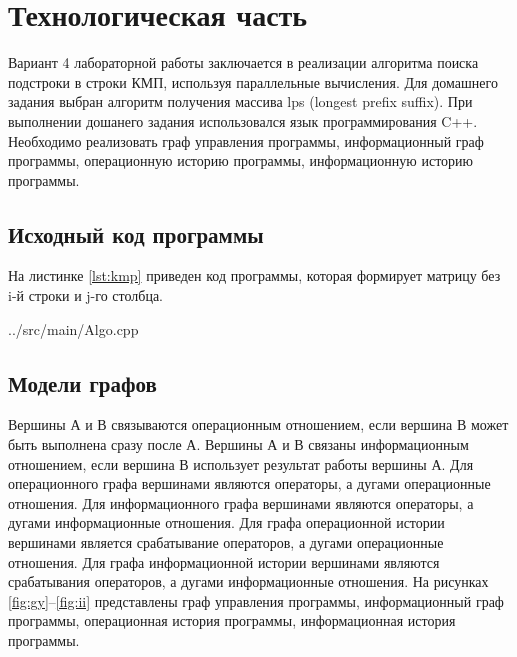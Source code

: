 \chapter{Технологическая часть}
Вариант 4 лабораторной работы заключается в реализации алгоритма поиска подстроки в строки КМП, используя параллельные вычисления. Для домашнего задания выбран алгоритм получения массива lps (longest prefix suffix). При выполнении дошанего задания использовался язык программирования C++. Необходимо реализовать граф управления программы, информационный граф программы, операционную историю программы, информационную историю программы. 
\section{Исходный код программы}
На листинке \ref{lst:kmp} приведен код программы, которая формирует матрицу без i-й строки и j-го столбца. 
\begin{lstinputlisting}[
	caption={Заполнение массива lps},
	label={lst:kmp},
	linerange={4-29}
	]{../src/main/Algo.cpp}
\end{lstinputlisting}
\section{Модели графов}
Вершины А и В связываются операционным отношением, если вершина В может быть выполнена сразу после А. Вершины А и В связаны информационным отношением, если вершина В использует результат работы вершины А. Для операционного графа вершинами являются операторы, а дугами операционные отношения. Для информационного графа вершинами являются операторы, а дугами информационные отношения. Для графа операционной истории вершинами является срабатывание операторов, а дугами операционные отношения. Для графа информационной истории вершинами являются срабатывания операторов, а дугами информационные отношения.
На рисунках \ref{fig:gy}--\ref{fig:ii} представлены граф управления программы, информационный граф программы, операционная история программы, информационная история программы.

